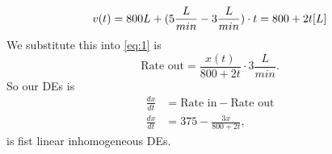 \begin{enumerate}
  \begin{equation*}
    \displaystyle v(t) = 800 L + (5 \frac{L}{min} - 3 \frac{L}{min}) \cdot t\\
     = 800 + 2t [L] \\
  \end{equation*}
  We substitute this into \ref{eq:1} is 
  \begin{equation*}
    \displaystyle \text{Rate out} = \frac{x(t)}{800 + 2t} \cdot 3 \frac{L}{min}.  
  \end{equation*}
  So our DEs is
  \begin{align*}
    \displaystyle \frac{dx}{dt} &= \text{Rate in} - \text{Rate out} \\
    \displaystyle \frac{dx}{dt} &= 375 - \frac{3x}{800 + 2t}, 
  \end{align*}
  is fist linear inhomogeneous DEs. 
\end{enumerate}
\clearpage

